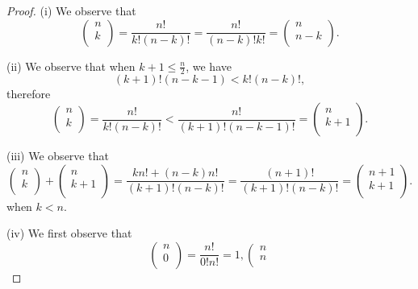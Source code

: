 \begin{proof}
(i) We observe that 
$$
\left( \begin{array}{c}
	n\\
	k\\
\end{array} \right) =\frac{n!}{k!\left( n-k \right) !}=\frac{n!}{\left( n-k \right) !k!}=\left( \begin{array}{c}
	n\\
	n-k\\
\end{array} \right) .
$$\par
(ii) We observe that when $k+1\le\frac{n}{2}$, we have 
$$
\left( k+1 \right) !\left( n-k-1 \right) <k!\left( n-k \right) !,
$$
therefore 
$$
\left( \begin{array}{c}
	n\\
	k\\
\end{array} \right) =\frac{n!}{k!\left( n-k \right) !}<\frac{n!}{\left( k+1 \right) !\left( n-k-1 \right) !}=\left( \begin{array}{c}
	n\\
	k+1\\
\end{array} \right) .
$$\par
(iii) We observe that 
$$
\left( \begin{array}{c}
	n\\
	k\\
\end{array} \right) +\left( \begin{array}{c}
	n\\
	k+1\\
\end{array} \right) =\frac{kn!+\left( n-k \right) n!}{\left( k+1 \right) !\left( n-k \right) !}=\frac{\left( n+1 \right) !}{\left( k+1 \right) !\left( n-k \right) !}=\left( \begin{array}{c}
	n+1\\
	k+1\\
\end{array} \right) .
$$
when $k<n$.\par
(iv) We first observe that 
$$
\left( \begin{array}{c}
	n\\
	0\\
\end{array} \right) =\frac{n!}{0!n!}=1,\left( \begin{array}{c}
	n\\
	n\\

\end{array}$$
\end{proof}
